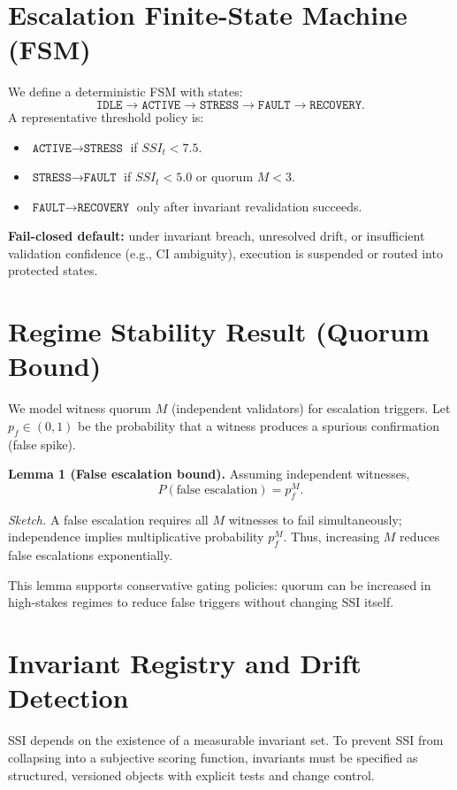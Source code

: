 \documentclass[conference]{IEEEtran}
\begin{document}
\section{Escalation Finite-State Machine (FSM)}
We define a deterministic FSM with states:
\[
\texttt{IDLE} \rightarrow \texttt{ACTIVE} \rightarrow \texttt{STRESS} \rightarrow \texttt{FAULT} \rightarrow \texttt{RECOVERY}.
\]
A representative threshold policy is:
\begin{itemize}
\item $\texttt{ACTIVE} \rightarrow \texttt{STRESS}$ if $SSI_t < 7.5$.
\item $\texttt{STRESS} \rightarrow \texttt{FAULT}$ if $SSI_t < 5.0$ or quorum $M < 3$.
\item $\texttt{FAULT} \rightarrow \texttt{RECOVERY}$ only after invariant revalidation succeeds.
\end{itemize}

\textbf{Fail-closed default:} under invariant breach, unresolved drift, or insufficient validation confidence (e.g., CI ambiguity), execution is suspended or routed into protected states.

\section{Regime Stability Result (Quorum Bound)}
We model witness quorum $M$ (independent validators) for escalation triggers.
Let $p_f \in (0,1)$ be the probability that a witness produces a spurious confirmation (false spike).

\textbf{Lemma 1 (False escalation bound).} Assuming independent witnesses,
\begin{equation}
\label{eq:pfm}
P(\text{false escalation}) = p_f^M.
\end{equation}

\textit{Sketch.} A false escalation requires all $M$ witnesses to fail simultaneously; independence implies multiplicative probability $p_f^M$.
Thus, increasing $M$ reduces false escalations exponentially.

This lemma supports conservative gating policies: quorum can be increased in high-stakes regimes to reduce false triggers without changing SSI itself.

\section{Invariant Registry and Drift Detection}
SSI depends on the existence of a measurable invariant set.
To prevent SSI from collapsing into a subjective scoring function, invariants must be specified as structured, versioned objects with explicit tests and change control.
\end{document}
